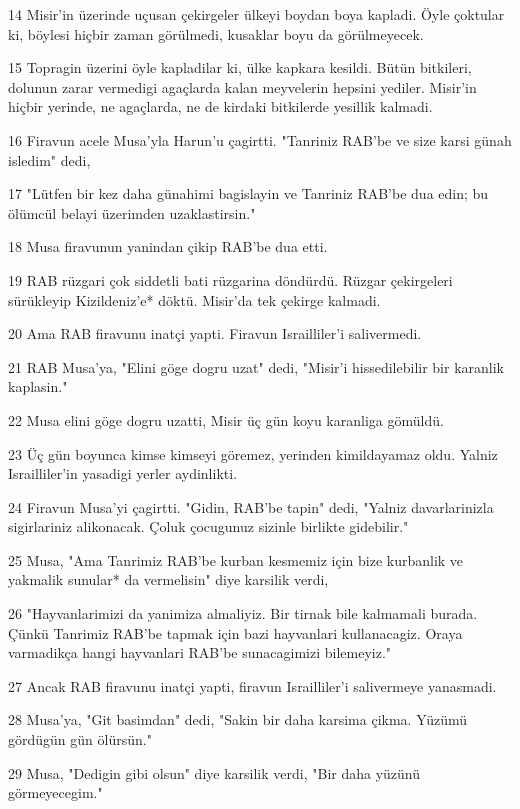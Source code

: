 \par 14 Misir'in üzerinde uçusan çekirgeler ülkeyi boydan boya kapladi. Öyle çoktular ki, böylesi hiçbir zaman görülmedi, kusaklar boyu da görülmeyecek.
\par 15 Topragin üzerini öyle kapladilar ki, ülke kapkara kesildi. Bütün bitkileri, dolunun zarar vermedigi agaçlarda kalan meyvelerin hepsini yediler. Misir'in hiçbir yerinde, ne agaçlarda, ne de kirdaki bitkilerde yesillik kalmadi.
\par 16 Firavun acele Musa'yla Harun'u çagirtti. "Tanriniz RAB'be ve size karsi günah isledim" dedi,
\par 17 "Lütfen bir kez daha günahimi bagislayin ve Tanriniz RAB'be dua edin; bu ölümcül belayi üzerimden uzaklastirsin."
\par 18 Musa firavunun yanindan çikip RAB'be dua etti.
\par 19 RAB rüzgari çok siddetli bati rüzgarina döndürdü. Rüzgar çekirgeleri sürükleyip Kizildeniz'e* döktü. Misir'da tek çekirge kalmadi.
\par 20 Ama RAB firavunu inatçi yapti. Firavun Israilliler'i salivermedi.
\par 21 RAB Musa'ya, "Elini göge dogru uzat" dedi, "Misir'i hissedilebilir bir karanlik kaplasin."
\par 22 Musa elini göge dogru uzatti, Misir üç gün koyu karanliga gömüldü.
\par 23 Üç gün boyunca kimse kimseyi göremez, yerinden kimildayamaz oldu. Yalniz Israilliler'in yasadigi yerler aydinlikti.
\par 24 Firavun Musa'yi çagirtti. "Gidin, RAB'be tapin" dedi, "Yalniz davarlarinizla sigirlariniz alikonacak. Çoluk çocugunuz sizinle birlikte gidebilir."
\par 25 Musa, "Ama Tanrimiz RAB'be kurban kesmemiz için bize kurbanlik ve yakmalik sunular* da vermelisin" diye karsilik verdi,
\par 26 "Hayvanlarimizi da yanimiza almaliyiz. Bir tirnak bile kalmamali burada. Çünkü Tanrimiz RAB'be tapmak için bazi hayvanlari kullanacagiz. Oraya varmadikça hangi hayvanlari RAB'be sunacagimizi bilemeyiz."
\par 27 Ancak RAB firavunu inatçi yapti, firavun Israilliler'i salivermeye yanasmadi.
\par 28 Musa'ya, "Git basimdan" dedi, "Sakin bir daha karsima çikma. Yüzümü gördügün gün ölürsün."
\par 29 Musa, "Dedigin gibi olsun" diye karsilik verdi, "Bir daha yüzünü görmeyecegim."

